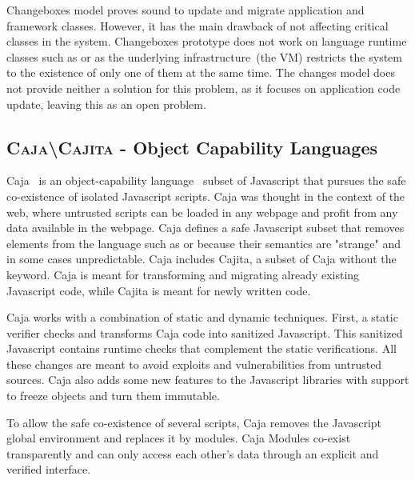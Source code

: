 Changeboxes model proves sound to update and migrate application and framework classes. However, it has the main drawback of not affecting critical classes in the system. Changeboxes prototype does not work on language runtime classes such as  or  as the underlying infrastructure~(the VM) restricts the system to the existence of only one of them at the same time. The changes model does not provide neither a solution for this problem, as it focuses on application code update, leaving this as an open problem.

\subsection*{\textsc{Caja\textbackslash Cajita} - Object Capability Languages}

Caja~\cite{Mill08a} is an object-capability language~\cite{Levy84a,Mill03a,Spoo00a} subset of Javascript that pursues the safe co-existence of isolated Javascript scripts. Caja was thought in the context of the web, where untrusted scripts can be loaded in any webpage and profit from any data available in the webpage. Caja defines a safe Javascript subset that removes elements from the language such as  or  because their semantics are "strange" and in some cases unpredictable. Caja includes Cajita, a subset of Caja without the  keyword. Caja is meant for transforming and migrating already existing Javascript code, while Cajita is meant for newly written code.

Caja works with a combination of static and dynamic techniques. First, a static verifier checks and transforms Caja code into sanitized Javascript. This sanitized Javascript contains runtime checks that complement the static verifications. All these changes are meant to avoid exploits and vulnerabilities from untrusted sources. Caja also adds some new features to the Javascript libraries with support to freeze objects and turn them immutable. 

To allow the safe co-existence of several scripts, Caja removes the Javascript global environment and replaces it by modules. Caja Modules co-exist transparently and can only access each other's data through an explicit and verified interface.
%

